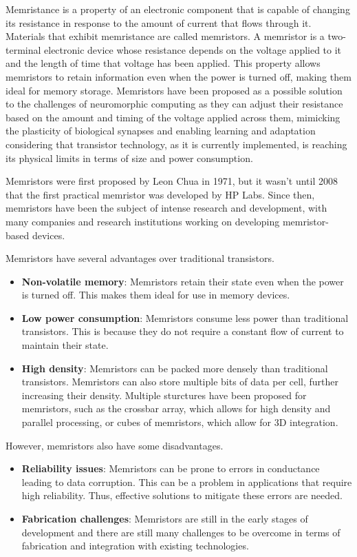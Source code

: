 \documentclass[screen, acmtog]{acmart}
\begin{document}
Memristance is a property of an electronic component that is capable of changing its resistance in response to the amount of current that flows through it. Materials that exhibit memristance are called memristors. A memristor is a two-terminal electronic device whose resistance depends on the voltage applied to it and the length of time that voltage has been applied. This property allows memristors to retain information even when the power is turned off, making them ideal for memory storage. Memristors have been proposed as a possible solution to the challenges of neuromorphic computing as they can adjust their resistance based on the amount and timing of the voltage applied across them, mimicking the plasticity of biological synapses and enabling learning and adaptation considering that transistor technology, as it is currently implemented, is reaching its physical limits in terms of size and power consumption.

Memristors were first proposed by Leon Chua in 1971, but it wasn't until 2008 that the first practical memristor was developed by HP Labs. Since then, memristors have been the subject of intense research and development, with many companies and research institutions working on developing memristor-based devices.

Memristors have several advantages over traditional transistors.

\begin{itemize}
    \item \textbf{Non-volatile memory}: Memristors retain their state even when the power is turned off. This makes them ideal for use in memory devices.
    \item \textbf{Low power consumption}: Memristors consume less power than traditional transistors. This is because they do not require a constant flow of current to maintain their state.
    \item \textbf{High density}: Memristors can be packed more densely than traditional transistors. Memristors can also store multiple bits of data per cell, further increasing their density. Multiple sturctures have been proposed for memristors, such as the crossbar array, which allows for high density and parallel processing, or cubes of memristors, which allow for 3D integration.
\end{itemize}

However, memristors also have some disadvantages.

\begin{itemize}
    \item \textbf{Reliability issues}: Memristors can be prone to errors in conductance leading to data corruption. This can be a problem in applications that require high reliability. Thus, effective solutions to mitigate these errors are needed.
    \item \textbf{Fabrication challenges}: Memristors are still in the early stages of development and there are still many challenges to be overcome in terms of fabrication and integration with existing technologies.
\end{itemize}
\end{document}
